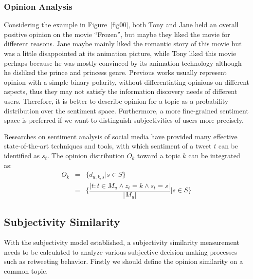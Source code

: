 \documentclass[letterpaper]{article}
\begin{document}
\subsubsection{Opinion Analysis}
\label{opinion}

Considering the example in Figure~\ref{fig00}, both Tony and Jane held an overall positive opinion on the movie ``Frozen'', but maybe they liked the movie for different reasons. Jane maybe mainly liked the romantic story of this movie but was a little disappointed at its animation picture, while Tony liked this movie perhaps because he was mostly convinced by its animation technology although he disliked the prince and princess genre. Previous works usually represent opinion with a simple binary polarity, without differentiating opinions on different aspects, thus they may not satisfy the information discovery needs of different users. Therefore, it is better to describe opinion for a topic as a probability distribution over the sentiment space. Furthermore, a more fine-grained sentiment space is preferred if we want to distinguish subjectivities of users more precisely.

Researches on sentiment analysis of social media have provided many effective state-of-the-art techniques and tools\cite{thelwall2010sentiment,hu2013unsupervised}, with which sentiment of a tweet $ t $ can be identified as $ s_t $. The opinion distribution $ O_k $ toward a topic $ k $ can be integrated as:
\begin{eqnarray}
O_k &= & \{ d_{u,k,s}|s \in S \} \nonumber \\
  &=& \{ \dfrac{|t:t \in M_u \wedge z_t=k \wedge s_t=s|}{|M_u|}|s \in S\}
\end{eqnarray}

\subsection{Subjectivity Similarity}
\label{similarity}

With the subjectivity model established, a subjectivity similarity measurement needs to be calculated to analyze various subjective decision-making processes such as retweeting behavior. 
Firstly we should define the opinion similarity on a common topic. 
 
\end{document}
